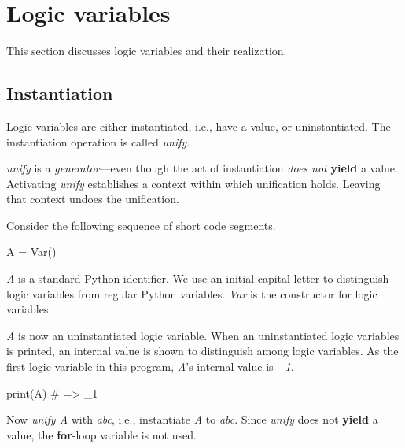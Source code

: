 
\section{Logic variables} \label{sec:logic-variables}
This section discusses logic variables and their realization. 

\subsection{Instantiation}
Logic variables are either instantiated, i.e., have a value, or uninstantiated. The instantiation operation is called \textit{unify}.   

\textit{unify} is a \textit{generator}---even though the act of instantiation \textit{does not} \textbf{yield} a value. Activating \textit{unify} establishes a context within which unification holds. Leaving that context undoes the unification. 

Consider the following sequence of short code segments. 
\begin{center}
\begin{minipage}[c]{0.45\textwidth}
\begin{python1}
A = Var()
\end{python1}
\end{minipage}
\end{center}
\textit{A} is a standard Python identifier. We use an initial capital letter to distinguish logic variables from regular Python variables. \textit{Var} is the constructor for logic variables.

\textit{A} is now an uninstantiated logic variable. When an uninstantiated logic variables is printed, an internal value is shown to distinguish among logic variables. As the first logic variable in this program, \textit{A}'s internal value is \textit{\_1}.

\begin{center}
\begin{minipage}[c]{0.45\textwidth}
\begin{python1}
print(A)  # => _1
\end{python1}
\end{minipage}
\end{center}

Now \textit{unify A} with \textit{abc}, i.e., instantiate \textit{A} to \textit{abc}. Since \textit{unify} does not \textbf{yield} a value, the \textbf{for}-loop variable is not used. 

